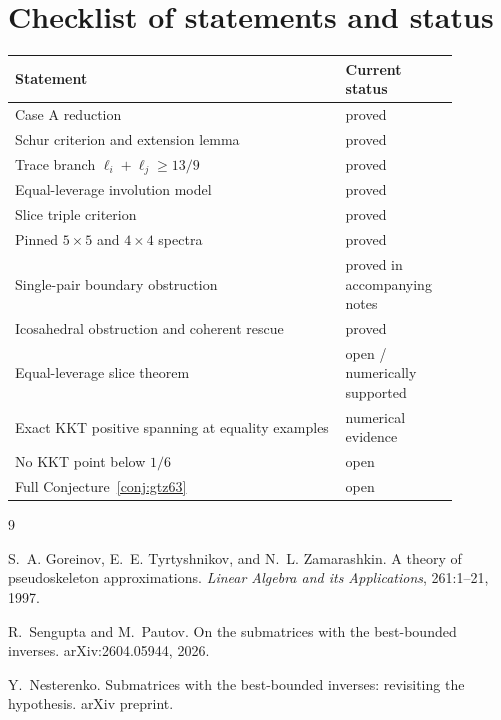 \documentclass[11pt]{article}
\numberwithin{equation}{section}
\theoremstyle{definition}
\begin{document}
\section{Checklist of statements and status}

\begin{center}
\begin{tabular}{p{0.66\linewidth}p{0.22\linewidth}}
\hline
Statement & Current status\\
\hline
Case A reduction & proved\\
Schur criterion and extension lemma & proved\\
Trace branch $\ell_i+\ell_j\ge13/9$ & proved\\
Equal-leverage involution model & proved\\
Slice triple criterion & proved\\
Pinned $5\times5$ and $4\times4$ spectra & proved\\
Single-pair boundary obstruction & proved in accompanying notes\\
Icosahedral obstruction and coherent rescue & proved\\
Equal-leverage slice theorem & open / numerically supported\\
Exact KKT positive spanning at equality examples & numerical evidence\\
No KKT point below $1/6$ & open\\
Full Conjecture~\ref{conj:gtz63} & open\\
\hline
\end{tabular}
\end{center}

\begin{thebibliography}{9}

S.~A. Goreinov, E.~E. Tyrtyshnikov, and N.~L. Zamarashkin.
\newblock A theory of pseudoskeleton approximations.
\newblock \emph{Linear Algebra and its Applications}, 261:1--21, 1997.

R.~Sengupta and M.~Pautov.
\newblock On the submatrices with the best-bounded inverses.
\newblock arXiv:2604.05944, 2026.

Y.~Nesterenko.
\newblock Submatrices with the best-bounded inverses: revisiting the hypothesis.
\newblock arXiv preprint.

\end{thebibliography}
\end{document}
